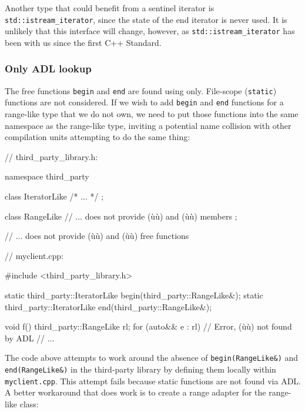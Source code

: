 {{{Another type that could benefit from a sentinel iterator is
\lstinline!std::istream_iterator!, since the state of the end iterator is
never used. It is unlikely that this interface will change, however, as
\lstinline!std::istream_iterator! has been with us since the first C++
Standard.

\subsubsection[Only ADL lookup]{Only ADL lookup}\label{only-adl-lookup}

The free functions \lstinline!begin! and \lstinline!end! are found using
 only. File-scope
(\lstinline!static!) functions are not considered. If we wish to add
\lstinline!begin! and \lstinline!end! functions for a range-like type that we
do not own, we need to put those functions into the same namespace as
the range-like type, inviting a potential name collision with other
compilation units attempting to do the same thing:

\begin{emcppslisting}[emcppsbatch=e8]
// third_party_library.h:

namespace third_party
{

    class IteratorLike { /* ... */ };

    class RangeLike
    {
        // ... does not provide (ù{}ù) and (ù{}ù) members
    };

    // ... does not provide (ù{}ù) and (ù{}ù) free functions
}
\end{emcppslisting}
\newpage%
\begin{emcppslisting}[emcppsbatch=e8]
// myclient.cpp:

#include <third_party_library.h>

static third_party::IteratorLike begin(third_party::RangeLike&);
static third_party::IteratorLike end(third_party::RangeLike&);

void f()
{
    third_party::RangeLike rl;
    for (auto&& e : rl)  // Error, (ù{}ù) not found by ADL
    {
        // ...
    }
}
\end{emcppslisting}


\noindent The code above attempts to work around the absence of
\lstinline!begin(RangeLike&)! and \lstinline!end(RangeLike&)! in the
third-party library by defining them locally within
\lstinline!myclient.cpp!. This attempt fails because static functions are
not found via ADL. A better workaround that does work is to create a
range adapter for the range-like class:

}}}
